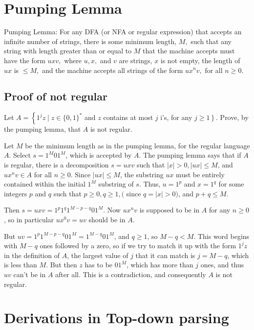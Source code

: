 \documentclass[a4paper]{exam}
\begin{document}
\section{Pumping Lemma \cite{pumpinglemma}}
Pumping Lemma: For any DFA (or NFA or regular expression) that accepts an infinite number of strings, there is some minimum length, \(M,\) such that any string
with length greater than or equal to \(M\) that the machine accepts must have the form
\(u x v,\) where \(u, x,\) and \(v\) are strings, \(x\) is not empty, the length of \(u x\) is \(\leq M,\) and the
machine accepts all strings of the form \(u x^{n} v,\) for all \(n \geq 0\).
\subsection{Proof of not regular} Let \(A=\left\{1^{j} z \mid z \in\{0,1\}^{*}\right.\) and \(z\) contains at most \(j\) i's, for any \(\left.j \geq 1\right\} .\) Prove, by the
pumping lemma, that \(A\) is not regular.\\
\begin{solution}
    Let $M$ be the minimum length as in the pumping lemma, for the regular language $A$. Select $s=1^{M} 01^{M}$, which is accepted by $A$. The pumping lemma says that if $A$ is regular, there is a decomposition $s=u x v$ such that $|x|>0,|u x| \leq M$, and $u x^{n} v \in A$ for all $n \geq 0$. Since $|u x| \leq M$, the substring $u x$ must be entirely contained within the initial $1^{M}$ substring of $s$. Thus, $u=1^{p}$ and $x=1^{q}$ for some integers $p$ and $q$ such that $p \geq 0, q \geq 1,($ since $q=|x|>0)$, and $p+q \leq M$.

    Then $s=u x v=1^{p} 1^{q} 1^{M-p-q} 01^{M} .$ Now $u x^{n} v$ is supposed to be in $A$ for any $n \geq 0$, so in particular $u x^{0} v=u v$ should be in $A$.

    But $u v=1^{p} 1^{M-p-q} 01^{M}=1^{M-q} 01^{M}$, and $q \geq 1$, so $M-q<M$. This word begins with $M-q$ ones followed by a zero, so if we try to match it up with the form $1^{j} z$ in the definition of $A$, the largest value of $j$ that it can match is $j=M-q$, which is less than $M$. But then $z$ has to be $01^{M}$, which has more than $j$ ones, and thus $u v$ can't be in $A$ after all. This is a contradiction, and consequently $A$ is not regular.
\end{solution}


\section{Derivations in Top-down parsing}
\end{document}
